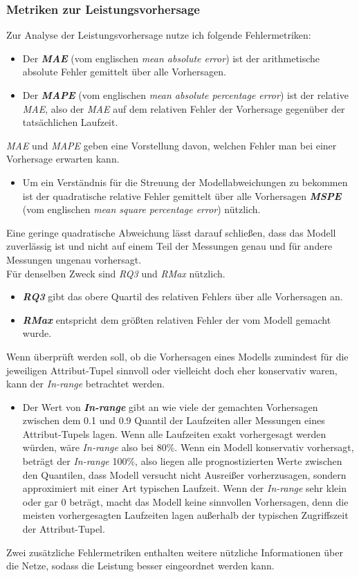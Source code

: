 \documentclass[
	12pt,
	a4paper,
	BCOR10mm,
	DIV14,
	listof=totoc,
	bibliography=totoc,
	headsepline
]{scrreprt}
\begin{document}
\subsubsection{Metriken zur Leistungsvorhersage}
Zur Analyse der Leistungsvorhersage nutze ich folgende Fehlermetriken:
\begin{itemize}
	\item Der \textit{\textbf{MAE}} (vom englischen \textit{mean absolute error}) ist der arithmetische absolute Fehler gemittelt über alle Vorhersagen.
	\item Der \textit{\textbf{MAPE}} (vom englischen \textit{mean absolute percentage error}) ist der relative \textit{MAE}, also der \textit{MAE} auf dem relativen Fehler der Vorhersage gegenüber der tatsächlichen Laufzeit.\\
\end{itemize}
\textit{MAE} und \textit{MAPE} geben eine Vorstellung davon, welchen Fehler man bei einer Vorhersage erwarten kann.
\begin{itemize}
	\item Um ein Verständnis für die Streuung der Modellabweichungen zu bekommen ist der quadratische relative Fehler gemittelt über alle Vorhersagen \textit{\textbf{MSPE}} (vom englischen \textit{mean square percentage error}) nützlich.
\end{itemize}
	Eine geringe quadratische Abweichung lässt darauf schließen, dass das Modell zuverlässig ist und nicht auf einem Teil der Messungen genau und für andere Messungen ungenau vorhersagt.\\
	Für denselben Zweck sind \textit{RQ3} und \textit{RMax} nützlich.
\begin{itemize}
	\item \textit{\textbf{RQ3}} gibt das obere Quartil des relativen Fehlers über alle Vorhersagen an.
	\item \textit{\textbf{RMax}} entspricht dem größten relativen Fehler der vom Modell gemacht wurde.
\end{itemize}
Wenn überprüft werden soll, ob die Vorhersagen eines Modells zumindest für die jeweiligen Attribut-Tupel sinnvoll oder vielleicht doch eher konservativ waren, kann der \textit{In-range} betrachtet werden.
\begin{itemize}
	\item Der Wert von \textit{\textbf{In-range}} gibt an wie viele der gemachten Vorhersagen zwischen dem 0.1 und 0.9 Quantil der Laufzeiten aller Messungen eines Attribut-Tupels lagen.
	Wenn alle Laufzeiten exakt vorhergesagt werden würden, wäre \textit{In-range} also bei 80\%. Wenn ein Modell konservativ vorhersagt, beträgt der \textit{In-range} 100\%, also liegen alle prognostizierten Werte zwischen den Quantilen, dass Modell \glqq versucht\grqq{} nicht Ausreißer vorherzusagen, sondern approximiert mit einer Art typischen Laufzeit. 
	Wenn der \textit{In-range} sehr klein oder gar 0 beträgt, macht das Modell keine sinnvollen Vorhersagen, denn die meisten vorhergesagten Laufzeiten lagen außerhalb der typischen Zugriffszeit der Attribut-Tupel.
\end{itemize}
Zwei zusätzliche Fehlermetriken enthalten weitere nützliche Informationen über die Netze, sodass die Leistung besser eingeordnet werden kann.
\end{document}
